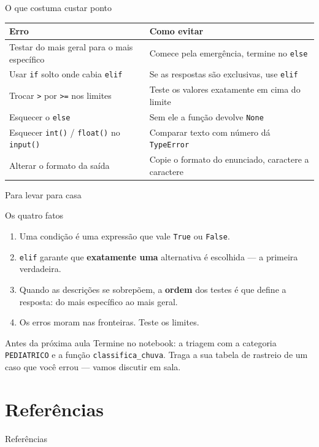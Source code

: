 \documentclass[aspectratio=169]{beamer}
\newcommand{\code}[1]{\texttt{\small #1}}
\begin{document}
\begin{frame}{O que costuma custar ponto}
  \begin{center}
  \scriptsize
  \begin{tabular}{@{}p{5.6cm}p{6.4cm}@{}}
    \toprule
    \textbf{Erro} & \textbf{Como evitar} \\
    \midrule
    Testar do mais geral para o mais específico
      & Comece pela emergência, termine no \code{else} \\
    Usar \code{if} solto onde cabia \code{elif}
      & Se as respostas são exclusivas, use \code{elif} \\
    Trocar \code{>} por \code{>=} nos limites
      & Teste os valores exatamente em cima do limite \\
    Esquecer o \code{else}
      & Sem ele a função devolve \code{None} \\
    Esquecer \code{int()} / \code{float()} no \code{input()}
      & Comparar texto com número dá \code{TypeError} \\
    Alterar o formato da saída
      & Copie o formato do enunciado, caractere a caractere \\
    \bottomrule
  \end{tabular}
  \end{center}
\end{frame}

\begin{frame}{Para levar para casa}
  \begin{block}{Os quatro fatos}
    \begin{enumerate}
      \item Uma condição é uma expressão que vale \code{True} ou \code{False}.
      \item \code{elif} garante que \textbf{exatamente uma} alternativa é
            escolhida --- a primeira verdadeira.
      \item Quando as descrições se sobrepõem, a \textbf{ordem} dos testes
            é que define a resposta: do mais específico ao mais geral.
      \item Os erros moram nas fronteiras. Teste os limites.
    \end{enumerate}
  \end{block}

  \vspace{0.2cm}
  \begin{exampleblock}{Antes da próxima aula}
    Termine no notebook: a triagem com a categoria \code{PEDIATRICO} e
    a função \code{classifica\_chuva}. Traga a sua tabela de rastreio de
    um caso que você errou --- vamos discutir em sala.
  \end{exampleblock}
\end{frame}

\section*{Referências}
\begin{frame}[allowframebreaks]{Referências}
  \scriptsize
  \nocite{*}
  
  
\end{frame}
\end{document}

